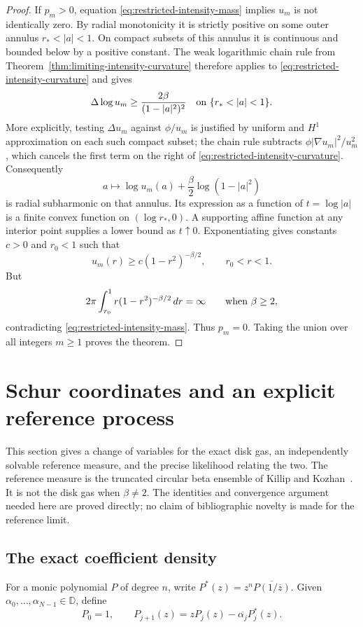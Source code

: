 \documentclass[11pt,a4paper]{article}
\numberwithin{equation}{section}
\theoremstyle{definition}
\theoremstyle{remark}
\begin{document}
\begin{proof}
If $p_m>0$, equation \eqref{eq:restricted-intensity-mass} implies
$u_m$ is not identically zero. By radial monotonicity it is strictly
positive on some outer annulus $r_*<|a|<1$. On compact subsets of this
annulus it is continuous and bounded below by a positive constant.
The weak logarithmic chain rule from
Theorem~\ref{thm:limiting-intensity-curvature} therefore applies to
\eqref{eq:restricted-intensity-curvature} and gives
\[
 \Delta\log u_m\ge\frac{2\beta}{(1-|a|^2)^2}
 \quad\hbox{on }\{r_*<|a|<1\}.
\]
More explicitly, testing $\Delta u_m$ against $\phi/u_m$ is justified
by uniform and $H^1$ approximation on each such compact subset; the
chain rule subtracts $\phi|\nabla u_m|^2/u_m^2$, which cancels the first
term on the right of \eqref{eq:restricted-intensity-curvature}.
Consequently
\[
 a\longmapsto\log u_m(a)+\frac\beta2\log(1-|a|^2)
\]
is radial subharmonic on that annulus. Its expression as a function of
$t=\log|a|$ is a finite convex function on $(\log r_*,0)$. A supporting
affine function at any interior point supplies a lower bound as
$t\uparrow0$. Exponentiating gives constants $c>0$ and $r_0<1$ such that
\[
 u_m(r)\ge c(1-r^2)^{-\beta/2},\qquad r_0<r<1.
\]
But
\[
 2\pi\int_{r_0}^1 r(1-r^2)^{-\beta/2}\,dr=\infty
 \qquad\hbox{when }\beta\ge2,
\]
contradicting \eqref{eq:restricted-intensity-mass}. Thus $p_m=0$.
Taking the union over all integers $m\ge1$ proves the theorem.
\end{proof}


\section{Schur coordinates and an explicit reference process}
\label{sec:schur-gram-reference}

This section gives a change of variables for the exact disk gas, an
independently solvable reference measure, and the precise likelihood
relating the two. The reference measure is the truncated circular beta ensemble
of Killip and Kozhan~\cite{KillipKozhan}. It is not the disk gas when
$\beta\ne2$. The identities and convergence argument needed here
are proved directly; no claim of bibliographic novelty is made for
the reference limit.

\subsection{The exact coefficient density}
For a monic polynomial $P$ of degree $n$, write
$P^*(z)=z^n\overline{P(1/\overline z)}$. Given
$\alpha_0,\ldots,\alpha_{N-1}\in\mathbb D$, define
\begin{equation}
 P_0=1,\qquad
 P_{j+1}(z)=zP_j(z)-\overline{\alpha_j}P_j^*(z).
 \label{eq:schur-exact-recursion}
\end{equation}
\end{document}
